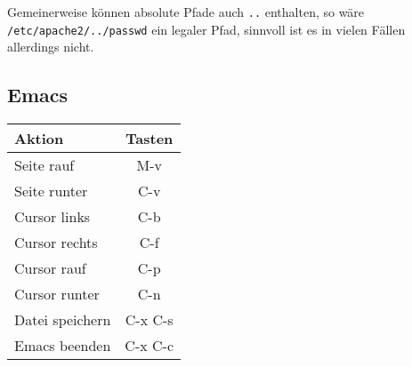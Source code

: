 \documentclass[12pt]{article}
\begin{document}
Gemeinerweise können absolute Pfade auch \texttt{..} enthalten, so wäre \texttt{/etc/\-apache2/\-../\-passwd} ein legaler Pfad, sinnvoll ist es in vielen Fällen allerdings nicht.

\subsection{Emacs}

\begin{tabular}{lc}
Aktion & Tasten \\
\hline
Seite rauf & M-v \\
Seite runter & C-v \\
Cursor links & C-b \\
Cursor rechts & C-f \\
Cursor rauf & C-p \\
Cursor runter & C-n \\
Datei speichern & C-x C-s \\
Emacs beenden & C-x C-c \\
\end{tabular}
\end{document}

